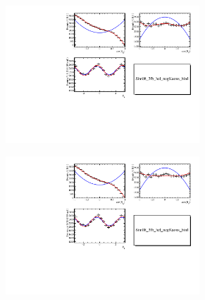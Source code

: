 \begin{figure}[h]
  \centering
  \begin{subfigure}{0.49\textwidth}
    \includegraphics[width=0.8\textwidth]{Figures/Chapter4/acc_nom.pdf}
    \caption{}
    \label{angAcc_nom}
  \end{subfigure}%
  \hfill%
  \begin{subfigure}{0.49\textwidth}
    \includegraphics[width=0.8\textwidth]{Figures/Chapter4/acc_constr.pdf}
    \caption{}
    \label{angAcc_constr}
  \end{subfigure}


\end{figure}
